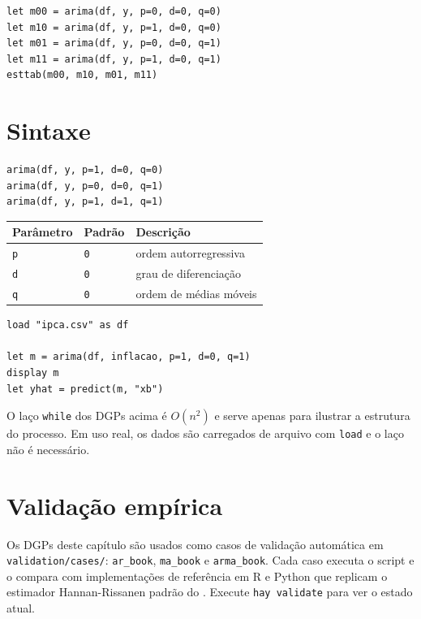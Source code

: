 \begin{lstlisting}[caption={Seleção de ordem por AIC}]
let m00 = arima(df, y, p=0, d=0, q=0)
let m10 = arima(df, y, p=1, d=0, q=0)
let m01 = arima(df, y, p=0, d=0, q=1)
let m11 = arima(df, y, p=1, d=0, q=1)
esttab(m00, m10, m01, m11)
\end{lstlisting}

\section{Sintaxe}

\begin{lstlisting}
arima(df, y, p=1, d=0, q=0)
arima(df, y, p=0, d=0, q=1)
arima(df, y, p=1, d=1, q=1)
\end{lstlisting}

\begin{center}
\begin{tabular}{lll}
\toprule
\textbf{Parâmetro} & \textbf{Padrão} & \textbf{Descrição} \\
\midrule
\texttt{p} & \texttt{0} & ordem autorregressiva \\
\texttt{d} & \texttt{0} & grau de diferenciação \\
\texttt{q} & \texttt{0} & ordem de médias móveis \\
\bottomrule
\end{tabular}
\end{center}

\begin{lstlisting}[caption={Fluxo típico com dados reais}]
load "ipca.csv" as df

let m = arima(df, inflacao, p=1, d=0, q=1)
display m
let yhat = predict(m, "xb")
\end{lstlisting}

\begin{nota}
  O laço \lstinline{while} dos DGPs acima é $O(n^2)$ e serve apenas para
  ilustrar a estrutura do processo. Em uso real, os dados são carregados
  de arquivo com \lstinline{load} e o laço não é necessário.
\end{nota}

\section{Validação empírica}

Os DGPs deste capítulo são usados como casos de validação automática em
\texttt{validation/cases/}: \texttt{ar_book}, \texttt{ma_book} e
\texttt{arma_book}. Cada caso executa o script \hayashi{} e o compara com
implementações de referência em R e Python que replicam o estimador
Hannan-Rissanen padrão do \hayashi{}. Execute \lstinline{hay validate} para
ver o estado atual.
